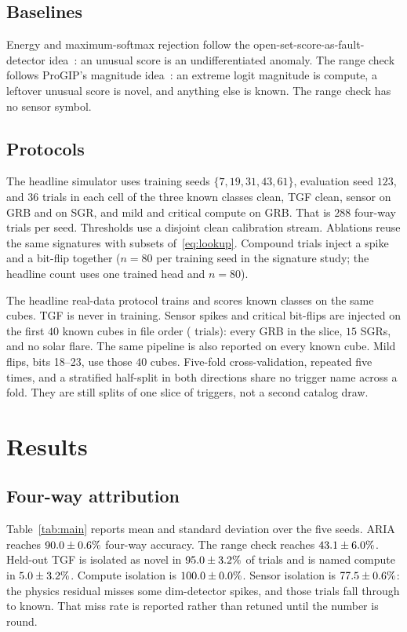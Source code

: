 \documentclass{ieeeaccess}
\begin{document}
\subsection{Baselines}

Energy and maximum-softmax rejection follow the open-set-score-as-fault-detector idea~\cite{gavarini2022,hendrycks2017,liu2020}: an unusual score is an undifferentiated anomaly. The range check follows ProGIP's magnitude idea~\cite{progip2025}: an extreme logit magnitude is compute, a leftover unusual score is novel, and anything else is known. The range check has no sensor symbol.

\subsection{Protocols}

The headline simulator uses training seeds $\{7,19,31,43,61\}$, evaluation seed $123$, and $36$ trials in each cell of the three known classes clean, TGF clean, sensor on GRB and on SGR, and mild and critical compute on GRB. That is $288$ four-way trials per seed. Thresholds use a disjoint clean calibration stream. Ablations reuse the same signatures with subsets of~\eqref{eq:lookup}. Compound trials inject a spike and a bit-flip together ($n=80$ per training seed in the signature study; the headline count uses one trained head and $n=80$).

The headline real-data protocol trains and scores known classes on the same cubes. TGF is never in training. Sensor spikes and critical bit-flips are injected on the first $40$ known cubes in file order (\RealTrials{} trials): every GRB in the slice, $15$ SGRs, and no solar flare. The same pipeline is also reported on every known cube. Mild flips, bits 18--23, use those $40$ cubes. Five-fold cross-validation, repeated five times, and a stratified half-split in both directions share no trigger name across a fold. They are still splits of one slice of \RealCubes{} triggers, not a second catalog draw.

\section{Results}
\label{sec:results}

\subsection{Four-way attribution}

Table~\ref{tab:main} reports mean and standard deviation over the five seeds. ARIA reaches $90.0\pm0.6\%$ four-way accuracy. The range check reaches $43.1\pm6.0\%$. Held-out TGF is isolated as novel in $95.0\pm3.2\%$ of trials and is named compute in $5.0\pm3.2\%$. Compute isolation is $100.0\pm0.0\%$. Sensor isolation is $77.5\pm0.6\%$: the physics residual misses some dim-detector spikes, and those trials fall through to known. That miss rate is reported rather than retuned until the number is round.
\end{document}

